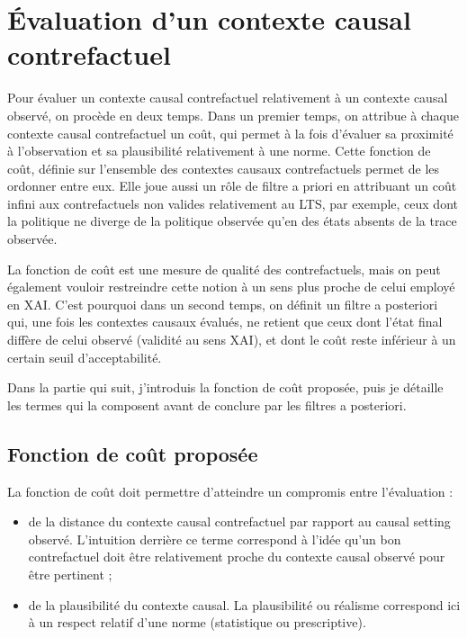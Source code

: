\section{Évaluation d'un contexte causal contrefactuel}\label{fct_cout}


Pour évaluer un contexte causal contrefactuel relativement à un contexte causal observé, on procède en deux temps. Dans un premier temps, on attribue à chaque contexte causal contrefactuel un coût, qui permet à la fois d'évaluer sa proximité à l'observation et sa plausibilité relativement à une norme. Cette fonction de coût, définie sur l'ensemble des contextes causaux contrefactuels permet de les ordonner entre eux. Elle joue aussi un rôle de filtre a priori en attribuant un coût infini aux contrefactuels non valides relativement au LTS, par exemple, ceux dont la politique ne diverge de la politique observée qu'en des états absents de la trace observée.

La fonction de coût est une mesure de qualité des contrefactuels, mais on peut également vouloir restreindre cette notion à un sens plus proche de celui employé en XAI. C'est pourquoi dans un second temps, on définit un filtre a posteriori qui, une fois les contextes causaux évalués, ne retient que ceux dont l'état final diffère de celui observé (validité au sens XAI), et dont le coût reste inférieur à un certain seuil d'acceptabilité.


Dans la partie qui suit, j'introduis la fonction de coût proposée, puis je détaille les termes qui la composent avant de conclure par les filtres a posteriori.

\subsection{Fonction de coût proposée}

La fonction de coût doit permettre d'atteindre un compromis entre l'évaluation :
\begin{itemize}
    \item  de la distance du contexte causal contrefactuel par rapport au causal setting  observé. L'intuition derrière ce terme correspond à l'idée qu'un bon contrefactuel doit être relativement proche du contexte causal observé pour être pertinent ;
    \item de la plausibilité du contexte causal. La plausibilité ou réalisme correspond ici à un respect relatif d'une norme (statistique ou prescriptive). 

\end{itemize}

